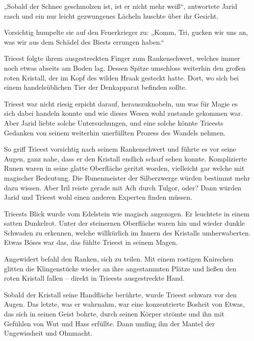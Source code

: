 „Sobald der Schnee geschmolzen ist, ist er nicht mehr weiß“, antwortete Jarid rasch und ein nur leicht gezwungenes Lächeln huschte über ihr Gesicht.

Vorsichtig humpelte sie auf den Feuerkrieger zu: „Komm, Tri, gucken wir uns an, was wir aus dem Schädel des Biests errungen haben.“

Trieest folgte ihrem ausgestreckten Finger zum Rankenschwert, welches immer noch etwas abseits am Boden lag. Dessen Spitze umschloss weiterhin den großen roten Kristall, der im Kopf des wilden Hraak gesteckt hatte. Dort, wo sich bei einem handelsüblichen Tier der Denkapparat befinden sollte.

Trieest war nicht riesig erpicht darauf, herauszuknobeln, um was für Magie es sich dabei handeln konnte und wie dieses Wesen wohl zustande gekommen war. Aber Jarid liebte solche Untersuchungen, und eine solche könnte Trieests Gedanken von seinem weiterhin unerfüllten Prozess des Wandels nehmen.

So griff Trieest vorsichtig nach seinem Rankenschwert und führte es vor seine Augen, ganz nahe, dass er den Kristall endlich scharf sehen konnte. Komplizierte Runen waren in seine glatte Oberfläche geritzt worden, vielleicht gar welche mit magischer Bedeutung. Die Runenmeister der Silberzwerge würden bestimmt mehr dazu wissen. Aber Iril reiste gerade mit Aćh durch Tulgor, oder? Dann würden Jarid und Trieest wohl einen anderen Experten finden müssen.

Trieests Blick wurde vom Edelstein wie magisch angezogen. Er leuchtete in einem satten Dunkelrot. Unter der steinernen Oberfläche waren hin und wieder dunkle Schwaden zu erkennen, welche willkürlich im Innern des Kristalls umherwaberten. Etwas Böses war das, das fühlte Trieest in seinem Magen.

Angewidert befahl den Ranken, sich zu teilen. Mit einem rostigen Knirschen glitten die Klingenstücke wieder an ihre angestammten Plätze und ließen den roten Kristall fallen – direkt in Trieests ausgestreckte Hand.

Sobald der Kristall seine Handfläche berührte, wurde Trieest schwarz vor den Augen. Das letzte, was er wahrnahm, war eine konzentrierte Bosheit von Etwas, das sich in seinen Geist bohrte, durch seinen Körper strömte und ihn mit Gefühlen von Wut und Hass erfüllte. Dann umfing ihn der Mantel der Ungewissheit und Ohnmacht.



\trennzeichen



